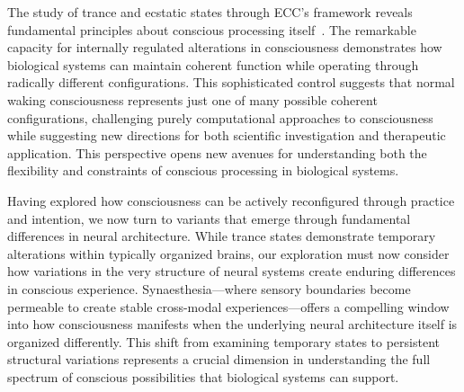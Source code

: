 The study of trance and ecstatic states through ECC's framework reveals fundamental principles about conscious processing itself~\cite{Rouget1985, pinotsis2023cytoelectric, Lewis2003, zheng2025unbearable}. The remarkable capacity for internally regulated alterations in consciousness demonstrates how biological systems can maintain coherent function while operating through radically different configurations. This sophisticated control suggests that normal waking consciousness represents just one of many possible coherent configurations, challenging purely computational approaches to consciousness while suggesting new directions for both scientific investigation and therapeutic application. This perspective opens new avenues for understanding both the flexibility and constraints of conscious processing in biological systems.

Having explored how consciousness can be actively reconfigured through practice and intention, we now turn to variants that emerge through fundamental differences in neural architecture. While trance states demonstrate temporary alterations within typically organized brains, our exploration must now consider how variations in the very structure of neural systems create enduring differences in conscious experience. Synaesthesia—where sensory boundaries become permeable to create stable cross-modal experiences—offers a compelling window into how consciousness manifests when the underlying neural architecture itself is organized differently. This shift from examining temporary states to persistent structural variations represents a crucial dimension in understanding the full spectrum of conscious possibilities that biological systems can support.
